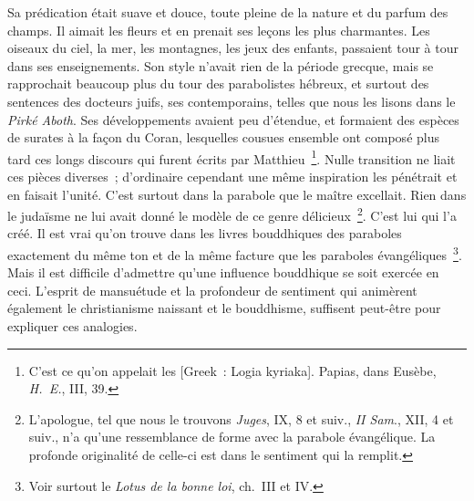 \documentclass[french,twoside]{book} %
\begin{document}
\noindent Sa prédication était suave et douce, toute pleine de la nature et du parfum des champs. Il aimait les fleurs et en prenait ses leçons les plus charmantes. Les oiseaux du ciel, la mer, les montagnes, les jeux des enfants, passaient tour à tour dans ses enseignements. Son style n’avait rien de la période grecque, mais se rapprochait beaucoup plus du tour des parabolistes hébreux, et surtout des sentences des docteurs juifs, ses contemporains, telles que nous les lisons dans le {\itshape Pirké Aboth}. Ses développements avaient peu d’étendue, et formaient des espèces de surates à la façon du Coran, lesquelles cousues ensemble ont composé plus tard ces longs discours qui furent écrits par Matthieu \footnote{ C’est ce qu’on appelait les [Greek : Logia kyriaka]. Papias, dans Eusèbe, {\itshape H. E.}, III, 39.}. Nulle transition ne liait ces pièces diverses ; d’ordinaire cependant une même inspiration les pénétrait et en faisait l’unité. C’est surtout dans la parabole que le maître excellait. Rien dans le judaïsme ne lui avait donné le modèle de ce genre délicieux \footnote{ L’apologue, tel que nous le trouvons {\itshape Juges}, IX, 8 et suiv., {\itshape II Sam}., XII, 4 et suiv., n’a qu’une ressemblance de forme avec la parabole évangélique. La profonde originalité de celle-ci est dans le sentiment qui la remplit.}. C’est lui qui l’a créé. Il est vrai qu’on trouve dans les livres bouddhiques des paraboles exactement du même ton et de la même facture que les paraboles évangéliques \footnote{ Voir surtout le {\itshape Lotus de la bonne loi}, ch. III et IV.}. Mais il est difficile d’admettre qu’une influence bouddhique se soit exercée en ceci. L’esprit de mansuétude et la profondeur de sentiment qui animèrent également le christianisme naissant et le bouddhisme, suffisent peut-être pour expliquer ces analogies.\par
\end{document}
